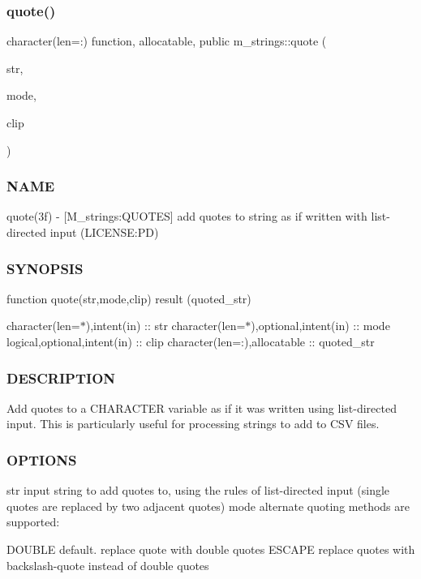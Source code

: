 \subsubsection{\texorpdfstring{quote()}{quote()}}
{\footnotesize\ttfamily character(len=\+:) function, allocatable, public m\+\_\+strings\+::quote (\begin{DoxyParamCaption}\item[{character(len=$\ast$), intent(in)}]{str,  }\item[{character(len=$\ast$), intent(in), optional}]{mode,  }\item[{logical, intent(in), optional}]{clip }\end{DoxyParamCaption})}



\subsubsection*{N\+A\+ME}

quote(3f) -\/ \mbox{[}M\+\_\+strings\+:Q\+U\+O\+T\+ES\mbox{]} add quotes to string as if written with list-\/directed input (L\+I\+C\+E\+N\+SE\+:PD) \subsubsection*{S\+Y\+N\+O\+P\+S\+IS}

function quote(str,mode,clip) result (quoted\+\_\+str)

character(len=$\ast$),intent(in) \+:\+: str character(len=$\ast$),optional,intent(in) \+:\+: mode logical,optional,intent(in) \+:\+: clip character(len=\+:),allocatable \+:\+: quoted\+\_\+str \subsubsection*{D\+E\+S\+C\+R\+I\+P\+T\+I\+ON}

Add quotes to a C\+H\+A\+R\+A\+C\+T\+ER variable as if it was written using list-\/directed input. This is particularly useful for processing strings to add to C\+SV files.

\subsubsection*{O\+P\+T\+I\+O\+NS}

str input string to add quotes to, using the rules of list-\/directed input (single quotes are replaced by two adjacent quotes) mode alternate quoting methods are supported\+: \begin{DoxyVerb}           DOUBLE   default. replace quote with double quotes
           ESCAPE   replace quotes with backslash-quote instead of double quotes
\end{DoxyVerb}



